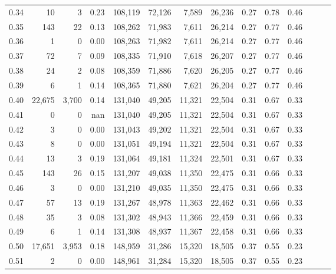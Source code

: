 \begin{tabular}{rrrrrrrrrrrrrr}
0.34 &      10 &      3 &  0.23 &  108,119 &   72,126 &   7,589 &  26,236 &  0.27 &  0.78 &      0.46 \\
0.35 &     143 &     22 &  0.13 &  108,262 &   71,983 &   7,611 &  26,214 &  0.27 &  0.77 &      0.46 \\
0.36 &       1 &      0 &  0.00 &  108,263 &   71,982 &   7,611 &  26,214 &  0.27 &  0.77 &      0.46 \\
0.37 &      72 &      7 &  0.09 &  108,335 &   71,910 &   7,618 &  26,207 &  0.27 &  0.77 &      0.46 \\
0.38 &      24 &      2 &  0.08 &  108,359 &   71,886 &   7,620 &  26,205 &  0.27 &  0.77 &      0.46 \\
0.39 &       6 &      1 &  0.14 &  108,365 &   71,880 &   7,621 &  26,204 &  0.27 &  0.77 &      0.46 \\
0.40 &  22,675 &  3,700 &  0.14 &  131,040 &   49,205 &  11,321 &  22,504 &  0.31 &  0.67 &      0.33 \\
0.41 &       0 &      0 &   nan &  131,040 &   49,205 &  11,321 &  22,504 &  0.31 &  0.67 &      0.33 \\
0.42 &       3 &      0 &  0.00 &  131,043 &   49,202 &  11,321 &  22,504 &  0.31 &  0.67 &      0.33 \\
0.43 &       8 &      0 &  0.00 &  131,051 &   49,194 &  11,321 &  22,504 &  0.31 &  0.67 &      0.33 \\
0.44 &      13 &      3 &  0.19 &  131,064 &   49,181 &  11,324 &  22,501 &  0.31 &  0.67 &      0.33 \\
0.45 &     143 &     26 &  0.15 &  131,207 &   49,038 &  11,350 &  22,475 &  0.31 &  0.66 &      0.33 \\
0.46 &       3 &      0 &  0.00 &  131,210 &   49,035 &  11,350 &  22,475 &  0.31 &  0.66 &      0.33 \\
0.47 &      57 &     13 &  0.19 &  131,267 &   48,978 &  11,363 &  22,462 &  0.31 &  0.66 &      0.33 \\
0.48 &      35 &      3 &  0.08 &  131,302 &   48,943 &  11,366 &  22,459 &  0.31 &  0.66 &      0.33 \\
0.49 &       6 &      1 &  0.14 &  131,308 &   48,937 &  11,367 &  22,458 &  0.31 &  0.66 &      0.33 \\
0.50 &  17,651 &  3,953 &  0.18 &  148,959 &   31,286 &  15,320 &  18,505 &  0.37 &  0.55 &      0.23 \\
0.51 &       2 &      0 &  0.00 &  148,961 &   31,284 &  15,320 &  18,505 &  0.37 &  0.55 &      0.23 \\

\end{tabular}
